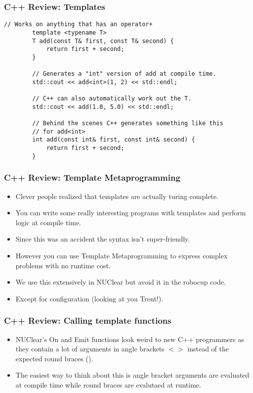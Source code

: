 \documentclass{beamer}
\begin{document}
\begin{frame}[fragile]
	\frametitle{C++ Review: Templates}
	\begin{lstlisting}[language=nuclear]
		// Works on anything that has an operator+
		template <typename T>
		T add(const T& first, const T& second) {
			return first + second;
		}
		
		// Generates a "int" version of add at compile time.
		std::cout << add<int>(1, 2) << std::endl;

		// C++ can also automatically work out the T.
		std::cout << add(1.0, 5.0) << std::endl;

		// Behind the scenes C++ generates something like this
		// for add<int>
		int add(const int& first, const int& second) {
			return first + second;
		}
	\end{lstlisting}
\end{frame}

\begin{frame}
	\frametitle{C++ Review: Template Metaprogramming}
	\begin{itemize}
		\item Clever people realized that templates are actually turing complete.
		\item You can write some really interesting programs with templates and perform logic at compile time.
		\item Since this was an accident the syntax isn't super-friendly.
		\item However you can use Template Metaprogramming to express complex problems with no runtime cost.
		\item We use this extensively in NUClear but avoid it in the robocup code.
		\item Except for configuration (looking at you Trent!).
	\end{itemize}
\end{frame}

\begin{frame}
	\frametitle{C++ Review: Calling template functions}
	\begin{itemize}
		\item NUClear's On and Emit functions look weird to new C++ programmers as they contain a lot of arguments in angle brackets 
			$<>$ instead of the expected round braces ().
		\item The easiest way to think about this is angle bracket arguments are evaluated at compile time while round braces are
			evalutaed at runtime. 
	\end{itemize}
\end{frame}
\end{document}
